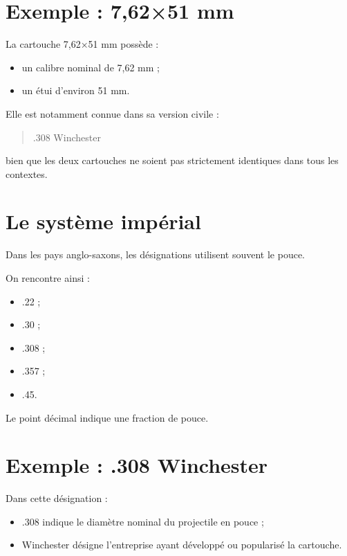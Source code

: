 \section{Exemple : 7,62×51 mm}

La cartouche 7,62×51 mm possède :

\begin{itemize}
    \item un calibre nominal de 7,62 mm ;
    \item un étui d'environ 51 mm.
\end{itemize}

Elle est notamment connue dans sa version civile :

\begin{quote}
.308 Winchester
\end{quote}

bien que les deux cartouches ne soient pas strictement identiques dans tous
les contextes.

\section{Le système impérial}

Dans les pays anglo-saxons, les désignations utilisent souvent le pouce.

On rencontre ainsi :

\begin{itemize}
    \item .22 ;
    \item .30 ;
    \item .308 ;
    \item .357 ;
    \item .45.
\end{itemize}

Le point décimal indique une fraction de pouce.

\section{Exemple : .308 Winchester}

Dans cette désignation :

\begin{itemize}
    \item .308 indique le diamètre nominal du projectile en pouce ;
    \item Winchester désigne l'entreprise ayant développé ou popularisé la
          cartouche.
\end{itemize}

